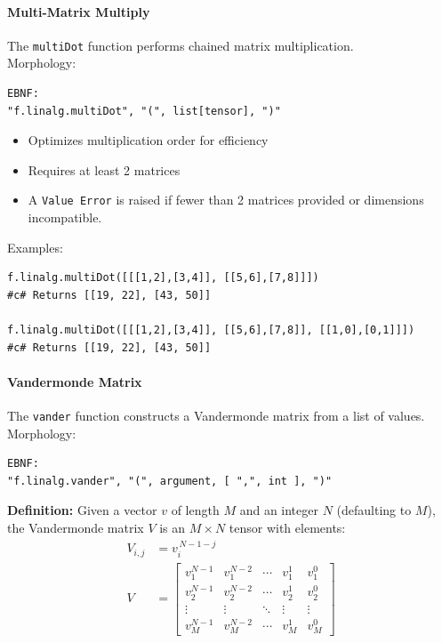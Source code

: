 \paragraph{Multi-Matrix Multiply}
The \texttt{multiDot} function performs chained matrix multiplication.\\
Morphology:
\begin{verbatim}
EBNF:
"f.linalg.multiDot", "(", list[tensor], ")"
\end{verbatim}
\begin{itemize}
\item Optimizes multiplication order for efficiency
\item Requires at least 2 matrices
\item A \texttt{Value Error} is raised if fewer than 2 matrices provided or dimensions incompatible.
\end{itemize}
Examples:
\begin{verbatim}
f.linalg.multiDot([[[1,2],[3,4]], [[5,6],[7,8]]])
#c# Returns [[19, 22], [43, 50]]

f.linalg.multiDot([[[1,2],[3,4]], [[5,6],[7,8]], [[1,0],[0,1]]])
#c# Returns [[19, 22], [43, 50]]
\end{verbatim}

\paragraph{Vandermonde Matrix}
The \texttt{vander} function constructs a Vandermonde matrix from a list of values.\\
Morphology:
\begin{verbatim}
EBNF:
"f.linalg.vander", "(", argument, [ ",", int ], ")"
\end{verbatim}

\textbf{Definition:} Given a vector $v$ of length $M$ and an integer $N$ (defaulting to $M$), the Vandermonde matrix $V$ is an $M \times N$ tensor with elements:
\begin{align*}
V_{i,j} &= v_i^{\,N-1-j} \\
V &= \begin{bmatrix}
v_1^{N-1} & v_1^{N-2} & \cdots & v_1^1 & v_1^0 \\
v_2^{N-1} & v_2^{N-2} & \cdots & v_2^1 & v_2^0 \\
\vdots    & \vdots    & \ddots & \vdots & \vdots  \\
v_M^{N-1} & v_M^{N-2} & \cdots & v_M^1 & v_M^0
\end{bmatrix}
\end{align*}

